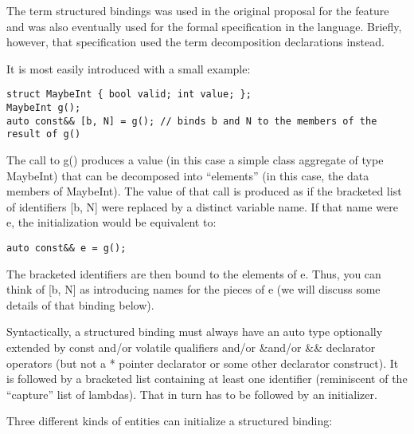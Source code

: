 \begin{tcolorbox}[colback=webgreen!5!white,colframe=webgreen!75!black]
\hspace*{0.75cm} The term structured bindings was used in the original proposal for the feature and was also eventually used for the formal specification in the language. Briefly, however, that specification used the term decomposition declarations instead.
\end{tcolorbox}

It is most easily introduced with a small example:

\begin{lstlisting}[style=styleCXX]
struct MaybeInt { bool valid; int value; };
MaybeInt g();
auto const&& [b, N] = g(); // binds b and N to the members of the result of g()
\end{lstlisting}

The call to g() produces a value (in this case a simple class aggregate of type MaybeInt) that can be decomposed into “elements” (in this case, the data members of MaybeInt). The value of that call is produced as if the bracketed list of identifiers [b, N] were replaced by a distinct variable name. If that name were e, the initialization would be equivalent to:

\begin{lstlisting}[style=styleCXX]
auto const&& e = g();
\end{lstlisting}

The bracketed identifiers are then bound to the elements of e. Thus, you can think of [b, N] as introducing names for the pieces of e (we will discuss some details of that binding below).

Syntactically, a structured binding must always have an auto type optionally extended by const and/or volatile qualifiers and/or \&and/or \&\& declarator operators (but not a * pointer declarator or some other declarator construct). It is followed by a bracketed list containing at least one identifier (reminiscent of the “capture” list of lambdas). That in turn has to be followed by an initializer.

Three different kinds of entities can initialize a structured binding:

